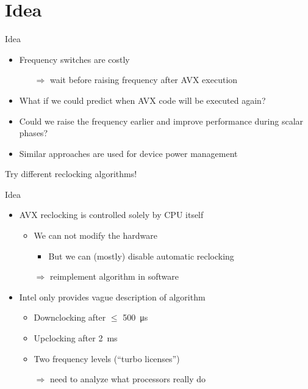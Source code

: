 \section{Idea}
\begin{frame}[t]{Idea}
	\begin{itemize}
		\item Frequency switches are costly
		\begin{itemize}
			\item[$\Rightarrow$] wait before raising frequency after AVX execution
		\end{itemize}
		\pause
		\item What if we could predict when AVX code will be executed again?
		\item Could we raise the frequency earlier and improve performance during scalar phases?
		\item Similar approaches are used for device power management
	\end{itemize}
	\pause
	\begin{center}
		\vspace{1em}
		Try different reclocking algorithms!
	\end{center}
\end{frame}

\begin{frame}[t]{Idea}
	\begin{itemize}
		\item AVX reclocking is controlled solely by CPU itself
		\begin{itemize}
			\item We can not modify the hardware
			\begin{itemize}
				\item But we can (mostly) disable automatic reclocking
			\end{itemize}
			\item[$\Rightarrow$] reimplement algorithm in software
		\end{itemize}
		\pause
		\item Intel only provides vague description of algorithm
		\begin{itemize}
			\item Downclocking after $\leq$ \SI{500}{\micro\second}
			\item Upclocking after \SI{2}{\milli\second}
			\item Two frequency levels (\enquote{turbo licenses})
			\item[$\Rightarrow$] need to analyze what processors really do
		\end{itemize}
	\end{itemize}
\end{frame}